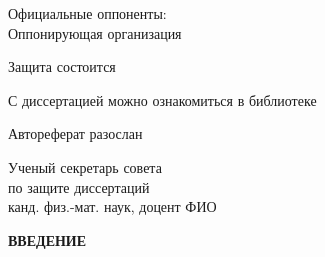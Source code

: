 \documentclass{thesisby}
\begin{document}
\vspace*{\fill} \noindent \hangindent=70mm  
    Официальные оппоненты: \hspace{10mm}%
    \\ [5pt]



\vspace*{\fill} \noindent \hangindent=66mm  Оппонирующая
организация \hspace{4mm} %


\vspace*{\fill} \noindent Защита состоится %


\vspace*{\fill} \noindent
С диссертацией можно ознакомиться в библиотеке %

\vspace*{\fill} \noindent
Автореферат разослан~

\vspace*{\fill}

\noindent Ученый секретарь совета \\ по защите диссертаций \\ канд. физ.-мат. наук, доцент
\hfill ФИО

\vspace*{\fill}

\vspace*{\fill}

\newpage
\setcounter{page}{1}

\centerline{\bf ВВЕДЕНИЕ}

\parindent=1cm

\medskip

\end{document}

